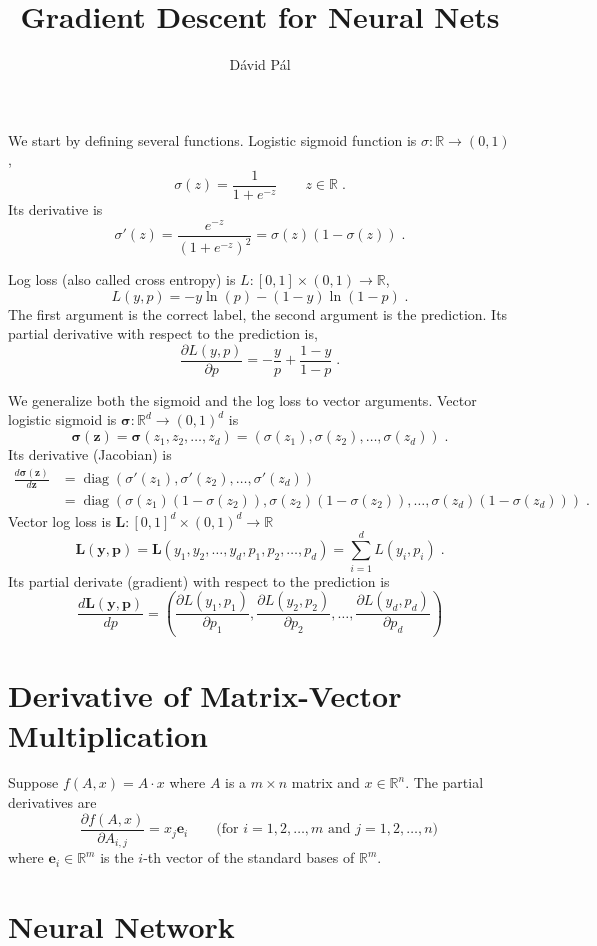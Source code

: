 \documentclass[12pt]{article}
\title{Gradient Descent for Neural Nets}
\author{D\'avid P\'al}
\DeclareMathOperator{\diag}{diag}
\newcommand{\R}{\mathbb{R}}
\newcommand{\bsigma}{\pmb{\sigma}}
\newcommand{\y}{\mathbf{y}}
\newcommand{\p}{\mathbf{p}}
\newcommand{\z}{\mathbf{z}}
\newcommand{\e}{\mathbf{e}}
\renewcommand{\L}{\mathbf{L}}
\begin{document}
\maketitle

We start by defining several functions.
Logistic sigmoid function is $\sigma:\R \to (0,1)$,
$$
\sigma(z) = \frac{1}{1 + e^{-z}} \qquad z \in \R \; .
$$
Its derivative is
$$
\sigma'(z) = \frac{e^{-z}}{(1 + e^{-z})^2} = \sigma(z) (1 - \sigma(z)) \; .
$$

Log loss (also called cross entropy) is $L:[0,1] \times (0,1) \to \R$,
$$
L(y,p) = - y \ln(p) - (1-y) \ln(1-p) \; .
$$
The first argument is the correct label, the second argument
is the prediction. Its partial derivative with respect to the prediction is,
$$
\frac{\partial L(y,p)}{\partial p} = - \frac{y}{p} + \frac{1-y}{1-p} \; .
$$

We generalize both the sigmoid and the log loss to vector arguments.
Vector logistic sigmoid is $\bsigma:\R^d \to (0,1)^d$ is
$$
\bsigma(\z) = \bsigma(z_1, z_2, \dots, z_d) = (\sigma(z_1), \sigma(z_2), \dots, \sigma(z_d)) \; .
$$
Its derivative (Jacobian) is
\begin{align*}
\frac{d \bsigma(\z)}{d\z}
& = \diag(\sigma'(z_1), \sigma'(z_2), \dots, \sigma'(z_d)) \\
& = \diag(\sigma(z_1) (1 - \sigma(z_2)), \sigma(z_2) (1 - \sigma(z_2)), \dots, \sigma(z_d) (1 - \sigma(z_d))) \; .
\end{align*}
Vector log loss is $\L:[0,1]^d \times (0,1)^d \to \R$
$$
\L(\y,\p) = \L(y_1, y_2, \dots, y_d, p_1, p_2, \dots, p_d) = \sum_{i=1}^d L(y_i, p_i) \; .
$$
Its partial derivate (gradient) with respect to the prediction is
$$
\frac{d \L(\y, \p)}{dp}
= \left(\frac{\partial L(y_1,p_1)}{\partial p_1}, \frac{\partial L(y_2,p_2)}{\partial p_2}, \dots, \frac{\partial L(y_d,p_d)}{\partial p_d} \right)
$$

\section{Derivative of Matrix-Vector Multiplication}

Suppose $f(A,x) = A \cdot x$ where $A$ is a $m \times n$ matrix and $x \in \R^n$.
The partial derivatives are
$$
\frac{\partial f(A,x)}{\partial A_{i,j}} = x_j \e_i \qquad \text{(for $i=1,2,\dots,m$ and $j=1,2,\dots,n$)} \,
$$
where $\e_i \in \R^m$ is the $i$-th vector of the standard bases of $\R^m$.

\section{Neural Network}
\end{document}
